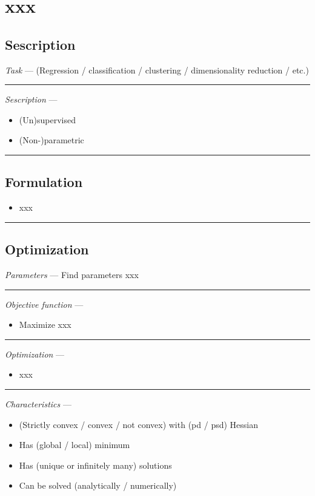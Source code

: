 \section{xxx}
\subsection*{Sescription}
\emph{Task} --- (Regression / classification / clustering / dimensionality reduction / etc.)

{\color{lightgray}\hrule height 0.001mm}

\emph{Sescription} --- 
\begin{itemize}
    \item (Un)supervised
    \item (Non-)parametric
\end{itemize}

{\color{black}\hrule height 0.001mm}

\subsection*{Formulation}

\begin{itemize}
    \item xxx
\end{itemize}

{\color{black}\hrule height 0.001mm}

\subsection*{Optimization}
\emph{Parameters} --- Find parameters xxx

{\color{lightgray}\hrule height 0.001mm}

\emph{Objective function} --- 
\begin{itemize}
    \item Maximize xxx
\end{itemize}

{\color{lightgray}\hrule height 0.001mm}

\emph{Optimization} ---
\begin{itemize}
    \item xxx
\end{itemize}

{\color{lightgray}\hrule height 0.001mm}

\emph{Characteristics} --- 
\begin{itemize}
    \item (Strictly convex / convex / not convex) with (pd / psd) Hessian
    \item Has (global / local) minimum
    \item Has (unique or infinitely many) solutions
    \item Can be solved (analytically / numerically) 
\end{itemize}

